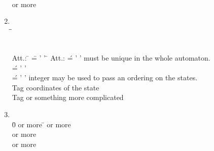 \begin{enumerate}
\begin{tabbing}
\\[\taglnskp]
\tagindent{} or more  \occ \\[\taglnskp]
\end{tabbing}


\item  {}

\begin{tabbing}
\\[\taglnskp]
\tagindent{}\tagsp \= \oneocc \= \opt \\[\taglnskp]
\tagindent{}   \>\oneocc \>\opt\\[\taglnskp]
\end{tabbing}

\begin{tabbing}
\ptn Att.: \=   \== ' ' \tagsp  \= \strng   \opt \kill
\ptn Att.:  \>\>  \' = ' '  \>\strng   \req
                           must be unique in the whole automaton. \\
            \>\>  \'= ' '  \> \strng   \opt   \\
            \>\>  \'= ' '  \> integer  \opt    may be used
            to pass an ordering on the states. \\

\ptn Tag    \tagsp   coordinates of
the state\\

\ptn Tag  \tagsp or something more complicated
\end{tabbing}
\clearpage 

\item  {}

\begin{tabbing}
\\[\taglnskp]
\tagindent{} \tagsp \= 0 or more \= \occ \kill
\tagindent{}  or more \> \occ \\[\taglnskp]
\tagindent{}   or more \> \occ \\[\taglnskp]
\tagindent{}     or more \> \occ \\[\taglnskp]
\end{tabbing}




\end{enumerate}
